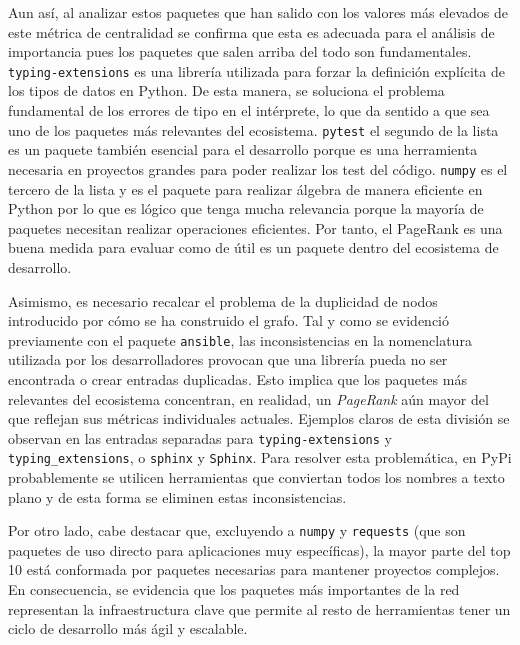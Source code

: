 \documentclass[12pt,a4paper]{report}
\begin{document}
	Aun así, al analizar estos paquetes que han salido con los valores más elevados de este métrica de centralidad se confirma que esta es adecuada para el análisis de importancia pues los paquetes que salen arriba del todo son fundamentales. \texttt{typing-extensions} es una librería utilizada para forzar la definición explícita de los tipos de datos en Python. De esta manera, se soluciona el problema fundamental de los errores de tipo en el intérprete, lo que da sentido a que sea uno de los paquetes más relevantes del ecosistema. \texttt{pytest} el segundo de la lista es un paquete también esencial para el desarrollo porque es una herramienta necesaria en proyectos grandes para poder realizar los test del código. \texttt{numpy} es el tercero de la lista y es el paquete para realizar álgebra de manera eficiente en Python por lo que es lógico que tenga mucha relevancia porque la mayoría de paquetes necesitan realizar operaciones eficientes. Por tanto, el PageRank es una buena medida para evaluar como de útil es un paquete dentro del ecosistema de desarrollo.
	\newline
	
	Asimismo, es necesario recalcar el problema de la duplicidad de nodos introducido por cómo se ha construido el grafo. Tal y como se evidenció previamente con el paquete \texttt{ansible}, las inconsistencias en la nomenclatura utilizada por los desarrolladores provocan que una librería pueda no ser encontrada o crear entradas duplicadas. Esto implica que los paquetes más relevantes del ecosistema concentran, en realidad, un \textit{PageRank} aún mayor del que reflejan sus métricas individuales actuales. Ejemplos claros de esta división se observan en las entradas separadas para \texttt{typing-extensions} y \texttt{typing\_extensions}, o \texttt{sphinx} y \texttt{Sphinx}. Para resolver esta problemática, en PyPi probablemente se utilicen herramientas que conviertan todos los nombres a texto plano y de esta forma se eliminen estas inconsistencias.
	\newline
	
	Por otro lado, cabe destacar que, excluyendo a \texttt{numpy} y \texttt{requests} (que son paquetes de uso directo para aplicaciones muy específicas), la mayor parte del top 10 está conformada por paquetes necesarias para mantener proyectos complejos. En consecuencia, se evidencia que los paquetes más importantes de la red representan la infraestructura clave que permite al resto de herramientas tener un ciclo de desarrollo más ágil y escalable.
	\newline
	
\end{document}
